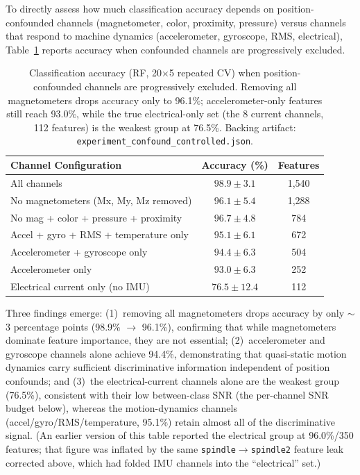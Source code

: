 To directly assess how much classification accuracy depends on position-confounded channels (magnetometer, color, proximity, pressure) versus channels that respond to machine dynamics (accelerometer, gyroscope, RMS, electrical), Table~\ref{tab:confound_controlled} reports accuracy when confounded channels are progressively excluded.

\begin{table}[H]
\caption{Classification accuracy (RF, 20$\times$5 repeated CV) when position-confounded channels are progressively excluded. Removing all magnetometers drops accuracy only to 96.1\%; accelerometer-only features still reach 93.0\%, while the true electrical-only set (the 8 current channels, 112 features) is the weakest group at 76.5\%. Backing artifact: \texttt{experiment\_confound\_controlled.json}.}\label{tab:confound_controlled}
\centering
\begin{tabular}{lcc}
\toprule
\textbf{Channel Configuration} & \textbf{Accuracy (\%)} & \textbf{Features} \\
\midrule
All channels                                  & $98.9 \pm 3.1$ & 1{,}540 \\
No magnetometers (Mx, My, Mz removed)       & $96.1 \pm 5.4$  & 1{,}288 \\
No mag + color + pressure + proximity        & $96.7 \pm 4.8$  & 784 \\
Accel + gyro + RMS + temperature only        & $95.1 \pm 6.1$  & 672 \\
Accelerometer + gyroscope only               & $94.4 \pm 6.3$  & 504 \\
Accelerometer only                           & $93.0 \pm 6.3$  & 252 \\
Electrical current only (no IMU)             & $76.5 \pm 12.4$ & 112 \\
\bottomrule
\end{tabular}
\end{table}

Three findings emerge: (1)~removing all magnetometers drops accuracy by only $\sim$3 percentage points (98.9\% $\to$ 96.1\%), confirming that while magnetometers dominate feature importance, they are not essential; (2)~accelerometer and gyroscope channels alone achieve 94.4\%, demonstrating that quasi-static motion dynamics carry sufficient discriminative information independent of position confounds; and (3)~the electrical-current channels alone are the weakest group (76.5\%), consistent with their low between-class SNR (the per-channel SNR budget below), whereas the motion-dynamics channels (accel/gyro/RMS/temperature, 95.1\%) retain almost all of the discriminative signal. (An earlier version of this table reported the electrical group at 96.0\%/350 features; that figure was inflated by the same \texttt{spindle}$\to$\texttt{spindle2} feature leak corrected above, which had folded IMU channels into the ``electrical'' set.)

